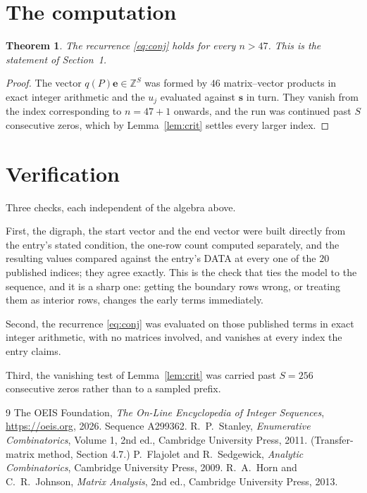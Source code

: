 \documentclass[11pt,a4paper]{article}
\theoremstyle{plain}
\newtheorem{theorem}{Theorem}
\theoremstyle{definition}
\begin{document}
\section{The computation}

\begin{theorem}
The recurrence \eqref{eq:conj} holds for every $n>47$. This is the statement of
Section~1.
\end{theorem}

\begin{proof}
The vector $q(P)\mathbf{e}\in\mathbb{Z}^{S}$ was formed by $46$ matrix--vector
products in exact integer arithmetic and the $u_j$ evaluated against $\mathbf{s}$ in turn.
They vanish from the index corresponding to $n=47+1$ onwards, and the run was continued
past $S$ consecutive zeros, which by Lemma~\ref{lem:crit} settles every larger index.
\end{proof}

\section{Verification}

Three checks, each independent of the algebra above.

First, the digraph, the start vector and the end vector were built directly from the
entry's stated condition, the one-row count computed separately, and the resulting values
compared against the entry's DATA at every one of the $20$ published indices; they
agree exactly. This is the check that ties the model to the sequence, and it is a sharp one:
getting the boundary rows wrong, or treating them as interior rows, changes the early terms
immediately.

Second, the recurrence \eqref{eq:conj} was evaluated on those published terms in exact
integer arithmetic, with no matrices involved, and vanishes at every index the entry claims.

Third, the vanishing test of Lemma~\ref{lem:crit} was carried past $S=256$ consecutive
zeros rather than to a sampled prefix.

\begin{thebibliography}{9}
 The OEIS Foundation, \emph{The On-Line Encyclopedia of Integer
Sequences}, \url{https://oeis.org}, 2026. Sequence A299362.
 R.~P.~Stanley, \emph{Enumerative Combinatorics}, Volume 1, 2nd ed.,
Cambridge University Press, 2011. (Transfer-matrix method, Section 4.7.)
 P.~Flajolet and R.~Sedgewick, \emph{Analytic Combinatorics}, Cambridge
University Press, 2009.
 R.~A.~Horn and C.~R.~Johnson, \emph{Matrix Analysis}, 2nd ed., Cambridge
University Press, 2013.
\end{thebibliography}
\end{document}
